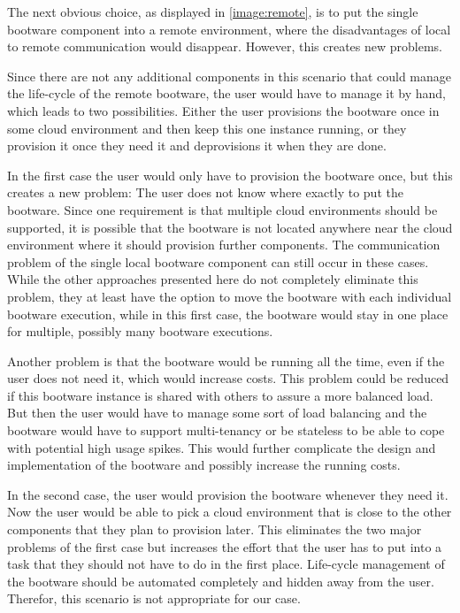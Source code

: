 The next obvious choice, as displayed in \autoref{image:remote}, is to put the single bootware component into a remote environment, where the disadvantages of local to remote communication would disappear.
However, this creates new problems.

Since there are not any additional components in this scenario that could manage the life-cycle of the remote bootware, the user would have to manage it by hand, which leads to two possibilities.
Either the user provisions the bootware once in some cloud environment and then keep this one instance running, or they provision it once they need it and deprovisions it when they are done.

In the first case the user would only have to provision the bootware once, but this creates a new problem: The user does not know where exactly to put the bootware.
Since one requirement is that multiple cloud environments should be supported, it is possible that the bootware is not located anywhere near the cloud environment where it should provision further components.
The communication problem of the single local bootware component can still occur in these cases.
While the other approaches presented here do not completely eliminate this problem, they at least have the option to move the bootware with each individual bootware execution, while in this first case, the bootware would stay in one place for multiple, possibly many bootware executions.

Another problem is that the bootware would be running all the time, even if the user does not need it, which would increase costs.
This problem could be reduced if this bootware instance is shared with others to assure a more balanced load.
But then the user would have to manage some sort of load balancing and the bootware would have to support multi-tenancy or be stateless to be able to cope with potential high usage spikes.
This would further complicate the design and implementation of the bootware and possibly increase the running costs.

In the second case, the user would provision the bootware whenever they need it. Now the user would be able to pick a cloud environment that is close to the other components that they plan to provision later.
This eliminates the two major problems of the first case but increases the effort that the user has to put into a task that they should not have to do in the first place.
Life-cycle management of the bootware should be automated completely and hidden away from the user.
Therefor, this scenario is not appropriate for our case.

